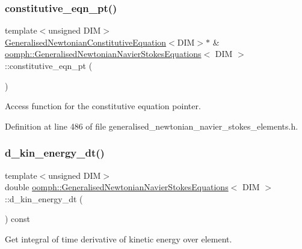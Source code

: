 \subsubsection{\texorpdfstring{constitutive\+\_\+eqn\+\_\+pt()}{constitutive\_eqn\_pt()}}
{\footnotesize\ttfamily template$<$unsigned D\+IM$>$ \\
\hyperlink{classoomph_1_1GeneralisedNewtonianConstitutiveEquation}{Generalised\+Newtonian\+Constitutive\+Equation}$<$D\+IM$>$$\ast$ \& \hyperlink{classoomph_1_1GeneralisedNewtonianNavierStokesEquations}{oomph\+::\+Generalised\+Newtonian\+Navier\+Stokes\+Equations}$<$ D\+IM $>$\+::constitutive\+\_\+eqn\+\_\+pt (\begin{DoxyParamCaption}{ }\end{DoxyParamCaption})\hspace{0.3cm}{\ttfamily [inline]}}



Access function for the constitutive equation pointer. 



Definition at line 486 of file generalised\+\_\+newtonian\+\_\+navier\+\_\+stokes\+\_\+elements.\+h.

\mbox{\label{classoomph_1_1GeneralisedNewtonianNavierStokesEquations_a8e8178ed41b5e4db3bf8f6d028cb0c43}} 
\subsubsection{\texorpdfstring{d\+\_\+kin\+\_\+energy\+\_\+dt()}{d\_kin\_energy\_dt()}}
{\footnotesize\ttfamily template$<$unsigned D\+IM$>$ \\
double \hyperlink{classoomph_1_1GeneralisedNewtonianNavierStokesEquations}{oomph\+::\+Generalised\+Newtonian\+Navier\+Stokes\+Equations}$<$ D\+IM $>$\+::d\+\_\+kin\+\_\+energy\+\_\+dt (\begin{DoxyParamCaption}{ }\end{DoxyParamCaption}) const}



Get integral of time derivative of kinetic energy over element. 

